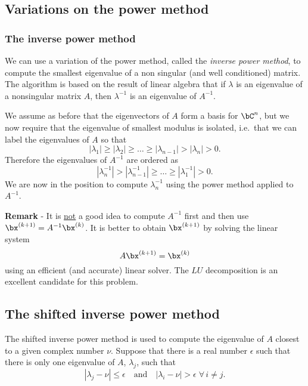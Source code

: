 \subsection{Variations on the power method}

\subsubsection{The inverse power method}

We can use a variation of the power method, called the \textit{inverse
power method}, to compute the smallest eigenvalue of a non singular
(and well conditioned) matrix.  The algorithm is based on the result
of linear algebra that if $\lambda$ is an eigenvalue of a nonsingular
matrix $A$, then $\lambda^{-1}$ is an eigenvalue of $A^{-1}$.

We assume as before that the eigenvectors of $A$ form a basis for
$\bC^n$, but we now require that the eigenvalue of smallest modulus is
isolated, i.e.\ that we can label the eigenvalues of $A$ so that
%
\begin{equation*}
  |\lambda_1| \ge |\lambda_2| \ge \ldots \ge |\lambda_{n-1}| >
  |\lambda_n| > 0 .
\end{equation*}
%
Therefore the eigenvalues of $A^{-1}$ are ordered as
%
\begin{equation*}
  |\lambda_n^{-1}| > |\lambda_{n-1}^{-1}| \ge \ldots \ge
  |\lambda_{1}^{-1}| > 0 .
\end{equation*}
%
We are now in the position to compute $\lambda_n^{-1}$ using the power
method applied to $A^{-1}$.

\smallskip

\noindent
\textbf{Remark} - It is \underline{not} a good idea to compute
$A^{-1}$ first and then use $\bx^{(k+1)} = A^{-1} \bx^{(k)}$.   It is
better to obtain $\bx^{(k+1)}$ by solving the linear system
%
\begin{equation*}
  A \bx^{(k+1)} = \bx^{(k)}
\end{equation*}
%
using an efficient (and accurate) linear solver.   The $LU$
decomposition is an excellent candidate for this problem.

\subsection{The shifted inverse power method}

The shifted inverse power method is used to compute the eigenvalue of
$A$ closest to a given complex number $\nu$.   Suppose that there is a
real number $\epsilon$ such that there is only one eigenvalue of $A$,
$\lambda_j$, such that
%
\begin{equation}
  |\lambda_j - \nu| \le \epsilon \quad \text{and} \quad
  |\lambda_i - \nu| > \epsilon \; \forall \, i \ne j.
  \label{eq:Ev10}
\end{equation}

